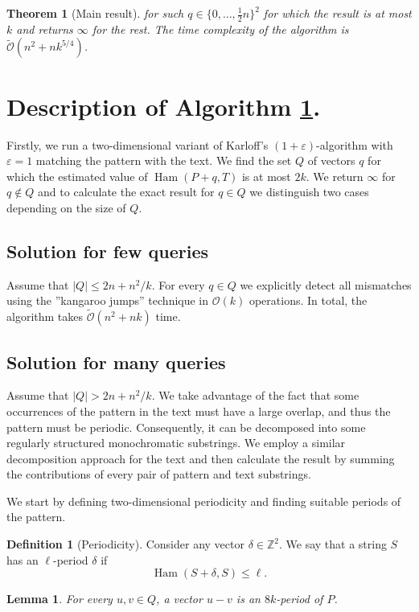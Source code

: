 \documentclass[11pt]{article}
\newcommand{\Z}{\mathbb{Z}}
\renewcommand{\O}{\mathcal{O}}
\newcommand{\tO}{\tilde{\mathcal{O}}}
\newcommand{\set}[1]{\lbrace #1 \rbrace}
\DeclareMathOperator*{\Ham}{Ham}
\theoremstyle{plain}
\newtheorem{theorem}{Theorem}
\newtheorem{lemma}{Lemma}
\theoremstyle{definition}
\newtheorem{definition}{Definition}
\begin{document}
\begin{theorem}[Main result]
	\label{main_algo}
	for such $q \in \set{0, \dots, \frac{1}{2}n}^2$ for which the result is at most $k$ and returns $\infty$ for the rest.
	The time complexity of the algorithm is $\tO(n^2 + nk^{5/4})$.
\end{theorem}


\section{Description of Algorithm \ref{main_algo}.}
Firstly, we run a two-dimensional variant of Karloff's $(1 + \varepsilon)$-algorithm with $\varepsilon = 1$ matching the pattern with the text.
We find the set $Q$ of vectors $q$ for which the estimated value of $\Ham(P + q, T)$ is at most $2k$.
We return $\infty$ for $q \not \in Q$ and to calculate the exact result for $q \in Q$ we distinguish two cases depending on the size of $Q$.


\subsection{Solution for few queries}
Assume that $|Q| \le 2n + n^2/k$.
For every $q \in Q$ we explicitly detect all mismatches using the ''kangaroo jumps'' technique in $\O(k)$ operations.
In total, the algorithm takes $\tO(n^2 + nk)$ time.


\subsection{Solution for many queries}
Assume that $|Q| > 2n + n^2/k$.
We take advantage of the fact that some occurrences of the pattern in the text must have a large overlap, and thus the pattern must be periodic.
Consequently, it can be decomposed into some regularly structured monochromatic substrings.
We employ a similar decomposition approach for the text and then calculate the result by summing the contributions of every pair of pattern and text substrings.

We start by defining two-dimensional periodicity and finding suitable periods of the pattern.


\begin{definition}[Periodicity]
	Consider any vector $\delta \in \Z^2$.
	We say that a string $S$ has an $\ell$-period $\delta$ if $$ \Ham(S + \delta, S) \le \ell. $$
\end{definition}


\begin{lemma} \label{periodicity_lemma}
	For every $u, v \in Q$, a vector $u - v$ is an $8k$-period of $P$.
\end{lemma}
\end{document}
